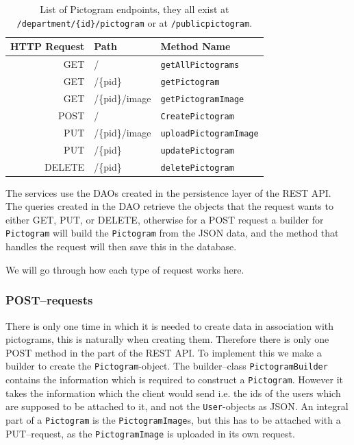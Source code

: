 \begin{table}[!htbp]
\footnotesize
\centering
\begin{tabular}{rll}
HTTP Request    & Path          & Method Name                   \\
\midrule
GET             &/              & \texttt{getAllPictograms}     \\
GET             &/\{pid\}       & \texttt{getPictogram}         \\
GET             &/\{pid\}/image & \texttt{getPictogramImage}    \\
\tblgrpsep
POST            &/              & \texttt{CreatePictogram}      \\
\tblgrpsep
PUT             &/\{pid\}/image & \texttt{uploadPictogramImage} \\
PUT             &/\{pid\}       & \texttt{updatePictogram}      \\
\tblgrpsep
DELETE          &/\{pid\}       & \texttt{deletePictogram}      \\
\end{tabular}
\caption{List of Pictogram endpoints, they all exist at \texttt{/department/\{id\}/pictogram} or at \texttt{/publicpictogram}.}\label{tbl:pictogramservice}
\end{table}

The services use the DAOs created in the persistence layer of the REST API.
The queries created in the DAO retrieve the objects that the request wants to either GET, PUT, or DELETE, otherwise for a POST request a builder for \texttt{Pictogram} will build the \texttt{Pictogram} from the JSON data, and the method that handles the request will then save this in the database.

We will go through how each type of request works here.

\subsubsection*{POST--requests}
There is only one time in which it is needed to create data in association with pictograms, this is naturally when creating them.
Therefore there is only one POST method in the part of the REST API.
To implement this we make a builder to create the \texttt{Pictogram}-object.
The builder--class \texttt{PictogramBuilder} contains the information which is required to construct a \texttt{Pictogram}.
However it takes the information which the client would send i.e. the ids of the users which are supposed to be attached to it, and not the \texttt{User}-objects as JSON.
An integral part of a \texttt{Pictogram} is the \texttt{PictogramImage}s, but this has to be attached with a PUT--request, as the \texttt{PictogramImage} is uploaded in its own request.

